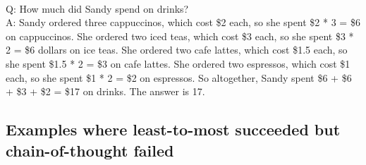  \\
Q: How much did Sandy spend on drinks? \\
A: Sandy ordered three cappuccinos, which cost \$2 each, so she spent \$2 * 3 = \$6 on cappuccinos. She ordered two iced teas, which cost \$3 each, so she spent \$3 * 2 = \$6 dollars on ice teas. She ordered two cafe lattes, which cost \$1.5 each, so she spent \$1.5 * 2 = \$3 on cafe lattes. She ordered two espressos, which cost \$1 each, so she spent \$1 * 2 = \$2 on espressos. So altogether, Sandy spent \$6 + \$6 + \$3 + \$2 = \$17 on drinks. The answer is 17. \\

\subsection{Examples where least-to-most succeeded but chain-of-thought failed}
\label{app:gsm8k-example}

